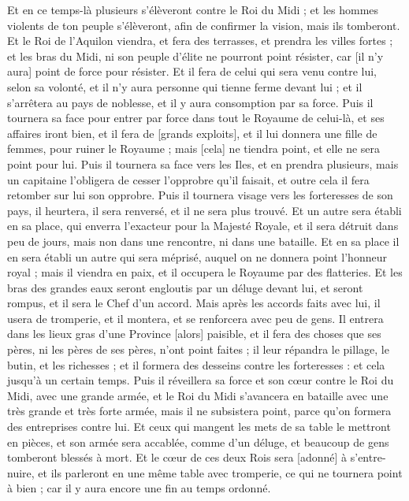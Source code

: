 \begin{multicols}{2}
Et en ce temps-là plusieurs s'élèveront contre le Roi du Midi ; et les hommes violents de ton peuple s'élèveront, afin de confirmer la vision, mais ils tomberont.
Et le Roi de l'Aquilon viendra, et fera des terrasses, et prendra les villes fortes ; et les bras du Midi, ni son peuple d'élite ne pourront point résister, car [il n'y aura] point de force pour résister.
Et il fera de celui qui sera venu contre lui, selon sa volonté, et il n'y aura personne qui tienne ferme devant lui ; et il s'arrêtera au pays de noblesse, et il y aura consomption par sa force.
Puis il tournera sa face pour entrer par force dans tout le Royaume de celui-là, et ses affaires iront bien, et il fera de [grands exploits], et il lui donnera une fille de femmes, pour ruiner le Royaume ; mais [cela] ne tiendra point, et elle ne sera point pour lui.
Puis il tournera sa face vers les Iles, et en prendra plusieurs, mais un capitaine l'obligera de cesser l'opprobre qu'il faisait, et outre cela il fera retomber sur lui son opprobre.
Puis il tournera visage vers les forteresses de son pays, il heurtera, il sera renversé, et il ne sera plus trouvé.
Et un autre sera établi en sa place, qui enverra l'exacteur pour la Majesté Royale, et il sera détruit dans peu de jours, mais non dans une rencontre, ni dans une bataille.
Et en sa place il en sera établi un autre qui sera méprisé, auquel on ne donnera point l'honneur royal ; mais il viendra en paix, et il occupera le Royaume par des flatteries.
Et les bras des grandes eaux seront engloutis par un déluge devant lui, et seront rompus, et il sera le Chef d'un accord.
Mais après les accords faits avec lui, il usera de tromperie, et il montera, et se renforcera avec peu de gens.
Il entrera dans les lieux gras d'une Province [alors] paisible, et il fera des choses que ses pères, ni les pères de ses pères, n'ont point faites ; il leur répandra le pillage, le butin, et les richesses ; et il formera des desseins contre les forteresses : et cela jusqu'à un certain temps.
Puis il réveillera sa force et son cœur contre le Roi du Midi, avec une grande armée, et le Roi du Midi s'avancera en bataille avec une très grande et très forte armée, mais il ne subsistera point, parce qu'on formera des entreprises contre lui.
Et ceux qui mangent les mets de sa table le mettront en pièces, et son armée sera accablée, comme d'un déluge, et beaucoup de gens tomberont blessés à mort.
Et le cœur de ces deux Rois sera [adonné] à s'entre-nuire, et ils parleront en une même table avec tromperie, ce qui ne tournera point à bien ; car il y aura encore une fin au temps ordonné.

\end{multicols}
